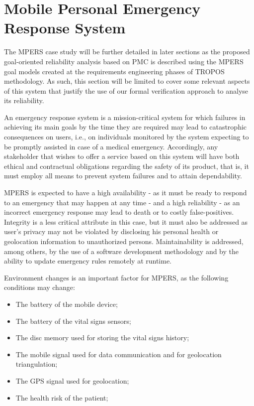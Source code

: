 \section{Mobile Personal Emergency Response System}

The MPERS case study will be further detailed in later sections as the proposed goal-oriented reliability analysis based on PMC is described using the MPERS goal models created at the requirements engineering phases of TROPOS methodology. As such, this section will be limited to cover some relevant aspects of this system that justify the use of our formal verification approach to analyse its reliability.

An emergency response system is a mission-critical system for which failures in achieving its main goals by the time they are required may lead to catastrophic consequences on users, i.e., on individuals monitored by the system expecting to be promptly assisted in case of a medical emergency. Accordingly, any stakeholder that wishes to offer a service based on this system will have both ethical and contractual obligations regarding the safety of its product, that is, it must employ all means to prevent system failures and to attain dependability.

MPERS is expected to have a high availability - as it must be ready to respond to an emergency that may happen at any time - and a high reliability - as an incorrect emergency response may lead to death or to costly false-positives. Integrity is a less critical attribute in this case, but it must also be addressed as user's privacy may not be violated by disclosing his personal health or geolocation information to unauthorized persons. Maintainability is addressed, among others, by the use of a software development methodology and by the ability to update emergency rules remotely at runtime.

Environment changes is an important factor for MPERS, as the following conditions may change:

\begin{itemize}

\item The battery of the mobile device;
\medskip

\item The battery of the vital signs sensors;
\medskip

\item The disc memory used for storing the vital signs history;

\item The mobile signal used for data communication and for geolocation triangulation;
\medskip

\item The GPS signal used for geolocation;
\medskip

\item The health risk of the patient;
\medskip

\end{itemize}


